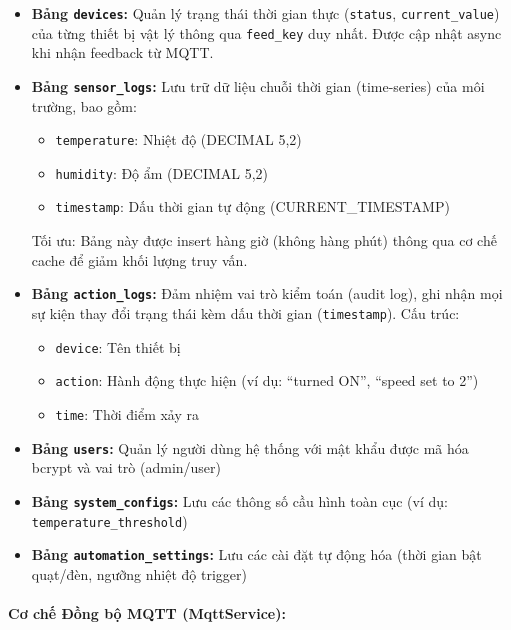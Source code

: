\begin{itemize}
    \item \textbf{Bảng \texttt{devices}:} Quản lý trạng thái thời gian thực (\texttt{status}, \texttt{current\_value}) của từng thiết bị vật lý thông qua \texttt{feed\_key} duy nhất. Được cập nhật async khi nhận feedback từ MQTT.
    
    \item \textbf{Bảng \texttt{sensor\_logs}:} Lưu trữ dữ liệu chuỗi thời gian (time-series) của môi trường, bao gồm:
    \begin{itemize}
        \item \texttt{temperature}: Nhiệt độ (DECIMAL 5,2)
        \item \texttt{humidity}: Độ ẩm (DECIMAL 5,2)
        \item \texttt{timestamp}: Dấu thời gian tự động (CURRENT\_TIMESTAMP)
    \end{itemize}
    Tối ưu: Bảng này được insert hàng giờ (không hàng phút) thông qua cơ chế cache để giảm khối lượng truy vấn.
    
    \item \textbf{Bảng \texttt{action\_logs}:} Đảm nhiệm vai trò kiểm toán (audit log), ghi nhận mọi sự kiện thay đổi trạng thái kèm dấu thời gian (\texttt{timestamp}). Cấu trúc:
    \begin{itemize}
        \item \texttt{device}: Tên thiết bị
        \item \texttt{action}: Hành động thực hiện (ví dụ: ``turned ON'', ``speed set to 2'')
        \item \texttt{time}: Thời điểm xảy ra
    \end{itemize}
    
    \item \textbf{Bảng \texttt{users}:} Quản lý người dùng hệ thống với mật khẩu được mã hóa bcrypt và vai trò (admin/user)
    
    \item \textbf{Bảng \texttt{system\_configs}:} Lưu các thông số cầu hình toàn cục (ví dụ: \texttt{temperature\_threshold})
    
    \item \textbf{Bảng \texttt{automation\_settings}:} Lưu các cài đặt tự động hóa (thời gian bật quạt/đèn, ngưỡng nhiệt độ trigger)
\end{itemize}

\paragraph{Cơ chế Đồng bộ MQTT (MqttService):}

